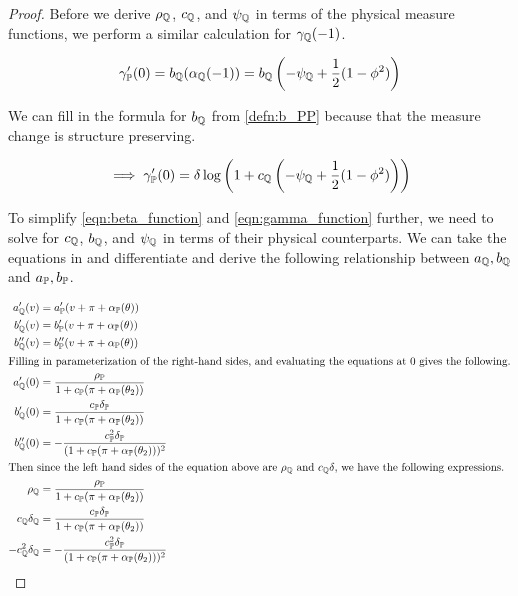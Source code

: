 \documentclass[11pt, letterpaper, twoside, final]{article}
\begin{document}
\begin{appendices}
\begin{proof}
Before we derive $\rho_{\mathbb{Q}}$, $c_{\mathbb{Q}}$, and $\psi_{\mathbb{Q}}$ in terms of the physical measure functions, we perform
a similar calculation for $\gamma_{\mathbb{Q}}(-1)$.

\begin{equation}
    \label{eqn:gamma_qq_at_minus_one}
    \gamma_{\mathbb{P}}'(0) = b_{\mathbb{Q}}(\alpha_{\mathbb{Q}}(-1))  = b_{\mathbb{Q}}\left(-\psi_{\mathbb{Q}} + \frac{1}{2} (1- \phi^2)\right)  
\end{equation}

We can fill in the formula for $b_{\mathbb{Q}}$ from \cref{defn:b_PP} because that the measure change is structure
preserving.

\begin{equation}
    \implies \gamma_{\mathbb{P}}'(0) = \delta \log\left(1 + c_{\mathbb{Q}} \left(-\psi_{\mathbb{Q}} + \frac{1}{2} (1-
    \phi^2)\right)\right)
    \label{eqn:gamma_function_QQ}
\end{equation}

To simplify \cref{eqn:beta_function} and \cref{eqn:gamma_function} further, we need to solve for $c_{\mathbb{Q}}$,
$b_{\mathbb{Q}}$, and $\psi_{\mathbb{Q}}$  in terms of their physical counterparts.
We can take the equations in \textcite[Proposition 5]{khrapov2016affine} and differentiate and derive the
following relationship between $a_{\mathbb{Q}}, b_{\mathbb{Q}}$ and $a_{\mathbb{P}}, b_{\mathbb{P}}$.

\begin{align}
    a_{\QQ}'(v) &= a_{\PP}'(v + \pi + \alpha_{\PP}(\theta))  \nonumber \\
%
    b_{\QQ}'(v) &= b_{\PP}'(v + \pi + \alpha_{\PP}(\theta))  \\
%
    b_{\QQ}''(v) &= b_{\PP}''(v + \pi + \alpha_{\PP}(\theta))  \nonumber \\
%
    \intertext{Filling in parameterization of the right-hand sides, and evaluating the equations at $0$ gives the
    following.} 
%
    a_{\QQ}'(0) &= \frac{\rho_{\PP}}{1 + c_{\PP}(\pi + \alpha_{\PP}(\theta_2))} \nonumber \\
%
    b_{\QQ}'(0) &= \frac{c_{\PP} \delta_{\PP}}{1 + c_{\PP}(\pi + \alpha_{\PP}(\theta_2))} \\
%
    b_{\QQ}''(0) &= -\frac{c_{\PP}^2 \delta_{\PP}}{(1 + c_{\PP}(\pi + \alpha_{\PP}(\theta_2)))^2} \nonumber \\
%
    \intertext{Then since the left hand sides of the equation above are $\rho_{\QQ}$ and $c_{\QQ} \delta$, we
    have the following expressions.}
%
    \rho_{\QQ} &= \frac{\rho_{\PP}}{1 + c_{\PP}(\pi + \alpha_{\PP}(\theta_2))} \nonumber \\
%
    \label{eqn:c_rho_delta_QQ}
    c_{\QQ} \delta_{\QQ} &= \frac{c_{\PP} \delta_{\PP}}{1 + c_{\PP}(\pi + \alpha_{\PP}(\theta_2))}  \\
%
    -c_{\QQ}^2 \delta_{\QQ} &= -\frac{c_{\PP}^2 \delta_{\PP}}{(1 + c_{\PP}(\pi + \alpha_{\PP}(\theta_2)))^2}
    \nonumber
\end{align}


\end{proof}
\end{appendices}
\end{document}

